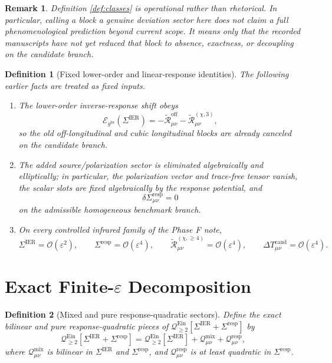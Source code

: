 \documentclass[11pt]{article}
\newcommand{\ObserverMetric}{g^{\mathrm{br}}}
\newcommand{\BaseShift}{\Sigma^{\mathrm{IER}}}
\newcommand{\ResponseShift}{\Sigma^{\mathrm{resp}}}
\newcommand{\ReOff}{\widetilde{\mathcal R}_{\mu\nu}^{\mathrm{off}}}
\newcommand{\ReLongThree}{\widetilde{\mathcal R}_{\mu\nu}^{(\chi,3)}}
\newcommand{\ReLongFour}{\widetilde{\mathcal R}_{\mu\nu}^{(\chi,\ge 4)}}
\newcommand{\DeltaTCand}{\Delta T_{\mu\nu}^{\mathrm{cand}}}
\newcommand{\EinLin}{\mathcal E_{\ObserverMetric}}
\newcommand{\EinQuad}{\mathcal Q_{\ge 2}^{\mathrm{Ein}}}
\newcommand{\MixQuad}{\mathcal Q_{\mu\nu}^{\mathrm{mix}}}
\newcommand{\RespQuad}{\mathcal Q_{\mu\nu}^{\mathrm{resp}}}
\newcommand{\epsIR}{\varepsilon}
\newtheorem{definition}{Definition}
\newtheorem{remark}{Remark}
\begin{document}
\begin{remark}
Definition \ref{def:classes} is operational rather than rhetorical. In particular, calling a block a genuine deviation sector here does not claim a full phenomenological prediction beyond current scope. It means only that the recorded manuscripts have not yet reduced that block to absence, exactness, or decoupling on the candidate branch.
\end{remark}

\begin{definition}[Fixed lower-order and linear-response identities]
\label{def:fixed}
The following earlier facts are treated as fixed inputs.
\begin{enumerate}
    \item The lower-order inverse-response shift obeys
    \begin{equation}
    \EinLin(\BaseShift)
    =
    -\ReOff
    -\ReLongThree,
    \label{eq:basesolve}
    \end{equation}
    so the old off-longitudinal and cubic longitudinal blocks are already canceled on the candidate branch.
    \item The added source/polarization sector is eliminated algebraically and elliptically; in particular, the polarization vector and trace-free tensor vanish, the scalar slots are fixed algebraically by the response potential, and
    \begin{equation}
    \delta\ResponseShift_{\mu\nu}=0
    \label{eq:linearzero}
    \end{equation}
    on the admissible homogeneous benchmark branch.
    \item On every controlled infrared family of the Phase F note,
    \begin{equation}
    \BaseShift=\mathcal O(\epsIR^2),
    \qquad
    \ResponseShift=\mathcal O(\epsIR^4),
    \qquad
    \ReLongFour=\mathcal O(\epsIR^4),
    \qquad
    \DeltaTCand=\mathcal O(\epsIR^4).
    \label{eq:phaseFbounds}
    \end{equation}
\end{enumerate}
\end{definition}

\section{Exact Finite-\texorpdfstring{\(\epsIR\)}{epsilon} Decomposition}

\begin{definition}[Mixed and pure response-quadratic sectors]
\label{def:split}
Define the exact bilinear and pure response-quadratic pieces of \(\EinQuad[\BaseShift+\ResponseShift]\) by
\begin{equation}
\EinQuad[\BaseShift+\ResponseShift]
=
\EinQuad[\BaseShift]
+\MixQuad
+\RespQuad,
\label{eq:quadsplit}
\end{equation}
where \(\MixQuad\) is bilinear in \(\BaseShift\) and \(\ResponseShift\), and \(\RespQuad\) is at least quadratic in \(\ResponseShift\).
\end{definition}
\end{document}
